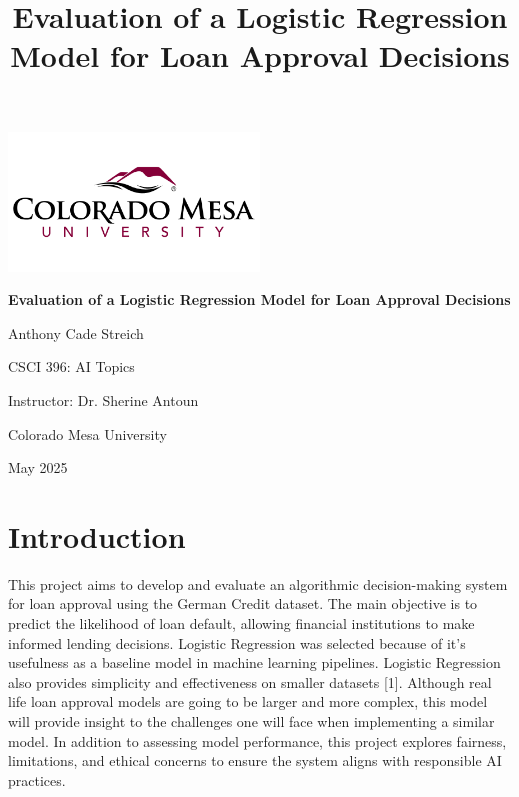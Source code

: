 \documentclass[12pt]{article}
\title{Evaluation of a Logistic Regression Model for Loan Approval Decisions}
\author{}
\date{}
\begin{document}
	
	\begin{titlepage}
	\centering
	\vspace*{2cm}
	
	\includegraphics[width=0.5\textwidth]{CMU Logo}
	\vspace{1cm}
	
	{\Huge \bfseries Evaluation of a Logistic Regression Model for Loan Approval Decisions \par}
	\vspace{1.5cm}
	
	{\Large Anthony Cade Streich \par}
	\vspace{0.5cm}
	
	CSCI 396: AI Topics \par
	Instructor: Dr. Sherine Antoun \par
	Colorado Mesa University \par
	\vfill
	
	{\large May 2025 \par}
	\end{titlepage}
	
	\section{Introduction}
	This project aims to develop and evaluate an algorithmic decision-making system for loan approval using the German Credit dataset. The main objective is to predict the likelihood of loan default, allowing financial institutions to make informed lending decisions. Logistic Regression was selected because of it's usefulness as a baseline model in machine learning pipelines. Logistic Regression also provides simplicity and effectiveness on smaller datasets [1].  Although real life loan approval models are going to be larger and more complex, this model will provide insight to the challenges one will face when implementing a similar model. In addition to assessing model performance, this project explores fairness, limitations, and ethical concerns to ensure the system aligns with responsible AI practices.
	
\end{document}

